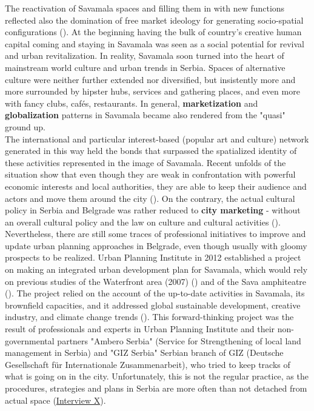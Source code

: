 \documentclass[11pt]{report}
\begin{document}
The reactivation of Savamala spaces and filling them in with new functions reflected also the domination of free market ideology for generating socio-spatial configurations (\citealt{world_bank_cities_2000}). 
At the beginning having the bulk of country's creative human capital coming and staying in Savamala was seen as a social potential for revival and urban revitalization.
In reality, Savamala soon turned into the heart of mainstream world culture and urban trends in Serbia.
Spaces of alternative culture were neither further extended nor diversified, but insistently more and more surrounded by hipster hubs, services and gathering places, and even more with fancy clubs, cafés, restaurants.
In general, \textbf{marketization} and \textbf{globalization} patterns in Savamala became also rendered from the "quasi" ground up.
\\

The international and particular interest-based (popular art and culture) network generated in this way held the bonds that surpassed the spatialized identity of these activities represented in the image of Savamala. Recent unfolds of the situation show that even though they are weak in confrontation with powerful economic interests and local authorities, they are able to keep their audience and actors and move them around the city (\cite{media}).
On the contrary, the actual cultural policy in Serbia and Belgrade was rather reduced to \textbf{city marketing} - without an overall cultural policy and the law on culture and cultural activities (\citealt{volic_belgrade_2012}).
\\

Nevertheless, there are still some traces of professional initiatives to improve and update urban planning approaches in Belgrade, even though usually with gloomy prospects to be realized.
Urban Planning Institute in 2012 established a project on making an integrated urban development plan for Savamala, which would rely on previous studies of the Waterfront area (2007)
(\cite{Nemanja Petrovic project})
and of the Sava amphiteatre
(\cite{ref studies}).
The project relied on the account of the up-to-date activities in Savamala, its brownfield capacities, and it addressed global sustainable development, creative industry, and climate change trends
(\cite{UZ Integrated Development plan}).
This forward-thinking project was the result of professionals and experts in Urban Planning Institute and their non-governmental partners "Ambero Serbia" (Service for Strengthening of local land management in Serbia) and "GIZ Serbia" {Serbian branch of  GIZ (Deutsche Gesellschaft für Internationale Zusammenarbeit)}, who tried to keep tracks of what is going on in the city.
Unfortunately, this is not the regular practice, as the procedures, strategies and plans in Serbia are more often than not detached from actual space
(\href{InterviewX}{Interview X}).
\\
\end{document}

